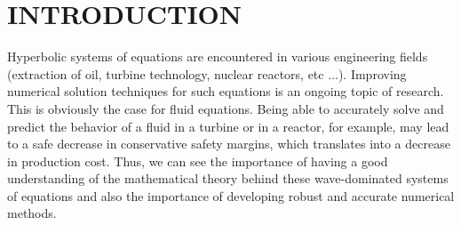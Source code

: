 %
%
%


\pagestyle{plain} %
\setcounter{page}{1}

\chapter{\uppercase {Introduction}}
Hyperbolic systems of equations are encountered in various engineering fields (extraction of oil, turbine technology, nuclear reactors, etc $\ldots$). Improving numerical solution techniques for such equations is an ongoing topic of research. This is obviously the case for fluid equations. Being able to accurately solve and predict the behavior of a fluid in a turbine or in a reactor, for example, may lead to a safe decrease in conservative safety margins, which translates into a decrease in production cost. Thus, we can see the importance of having a good understanding of the mathematical theory behind these wave-dominated systems of equations and also the importance of developing robust and accurate numerical methods.


